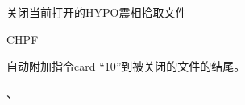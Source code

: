 \label{cmd:chpf}

关闭当前打开的HYPO震相拾取文件

\begin{SACSTX}
CHPF
\end{SACSTX}

自动附加指令card ``10''到被关闭的文件的结尾。

、
